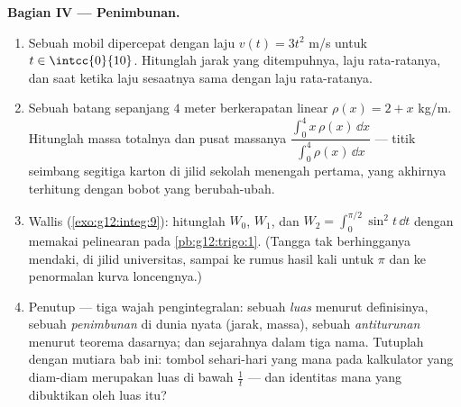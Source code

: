 \begin{problem}
\medskip
\noindent\textbf{Bagian IV --- Penimbunan.}
\begin{enumerate}[resume]
  \item Sebuah mobil dipercepat dengan laju $v(t) = 3t^2$ m/s untuk
        $t \in \intcc{0}{10}$. Hitunglah jarak yang ditempuhnya,
        laju rata-ratanya, dan saat ketika
        laju sesaatnya sama dengan laju rata-ratanya.
  \item Sebuah batang sepanjang $4$ meter berkerapatan linear
        $\rho(x) = 2 + x$ kg/m. Hitunglah massa totalnya dan pusat
        massanya
        $\dfrac{\int_0^4 x\,\rho(x)\,\dd x}{\int_0^4
        \rho(x)\,\dd x}$ --- titik seimbang segitiga karton di
        jilid sekolah menengah pertama, yang akhirnya
        terhitung dengan bobot yang berubah-ubah.
  \item {} Wallis (\cref{exo:g12:integ:9}): hitunglah
        $W_0$, $W_1$, dan
        $W_2 = \int_0^{\pi/2} \sin^2 t\,\dd t$ dengan memakai
        pelinearan pada \cref{pb:g12:trigo:1}. (Tangga tak berhingganya
        mendaki, di jilid universitas, sampai ke rumus hasil kali
        untuk $\pi$ dan ke penormalan kurva
        loncengnya.)
  \item Penutup --- tiga wajah pengintegralan: sebuah \emph{luas}
        menurut definisinya, sebuah \emph{penimbunan} di dunia nyata
        (jarak, massa), sebuah \emph{antiturunan} menurut
        teorema dasarnya; dan sejarahnya dalam tiga nama.
        Tutuplah dengan mutiara bab ini: tombol sehari-hari yang mana
        pada kalkulator yang diam-diam merupakan luas di bawah
        $\frac1t$ --- dan identitas mana yang dibuktikan oleh luas itu?

\end{enumerate}
\end{problem}
